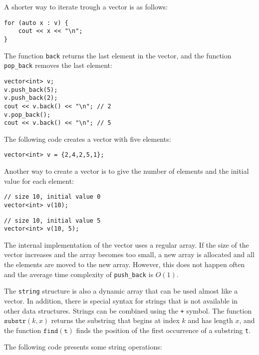 \begin{samepage}
A shorter way to iterate trough a vector is as follows:

\begin{lstlisting}
for (auto x : v) {
    cout << x << "\n";
}
\end{lstlisting}
\end{samepage}

The function \texttt{back} returns the last element
in the vector, and
the function \texttt{pop\_back} removes the last element:

\begin{lstlisting}
vector<int> v;
v.push_back(5);
v.push_back(2);
cout << v.back() << "\n"; // 2
v.pop_back();
cout << v.back() << "\n"; // 5
\end{lstlisting}

The following code creates a vector with five elements:

\begin{lstlisting}
vector<int> v = {2,4,2,5,1};
\end{lstlisting}

Another way to create a vector is to give the number
of elements and the initial value for each element:

\begin{lstlisting}
// size 10, initial value 0
vector<int> v(10);
\end{lstlisting}
\begin{lstlisting}
// size 10, initial value 5
vector<int> v(10, 5);
\end{lstlisting}

The internal implementation of the vector
uses a regular array.
If the size of the vector increases and
the array becomes too small,
a new array is allocated and all the
elements are moved to the new array.
However, this does not happen often and the
average time complexity of
\texttt{push\_back} is $O(1)$.


The \texttt{string} structure
is also a dynamic array that can be used almost like a vector.
In addition, there is special syntax for strings
that is not available in other data structures.
Strings can be combined using the \texttt{+} symbol.
The function $\texttt{substr}(k,x)$ returns the substring
that begins at index $k$ and has length $x$,
and the function $\texttt{find}(\texttt{t})$ finds the position
of the first occurrence of a substring \texttt{t}.

The following code presents some string operations:

